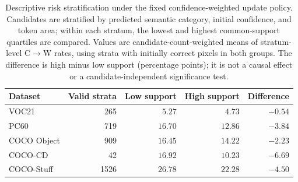 \begin{table}[t]
\caption{Descriptive risk stratification under the fixed confidence-weighted update policy. Candidates are stratified by predicted semantic category, initial confidence, and token area; within each stratum, the lowest and highest common-support quartiles are compared. Values are candidate-count-weighted means of stratum-level C$\to$W rates, using strata with initially correct pixels in both groups. The difference is high minus low support (percentage points); it is not a causal effect or a candidate-independent significance test.}
\label{tab:risk-strata}
\centering\small
\begin{tabular}{@{}lrrrr@{}}
\toprule
Dataset & Valid strata & Low support & High support & Difference \\
\midrule
VOC21 & 265 & $5.27$ & $4.73$ & $-0.54$ \\
PC60 & 719 & $16.70$ & $12.86$ & $-3.84$ \\
COCO Object & 909 & $16.45$ & $14.22$ & $-2.23$ \\
COCO-CD & 42 & $16.92$ & $10.23$ & $-6.69$ \\
COCO-Stuff & 1526 & $26.78$ & $22.28$ & $-4.50$ \\
\bottomrule
\end{tabular}
\end{table}
